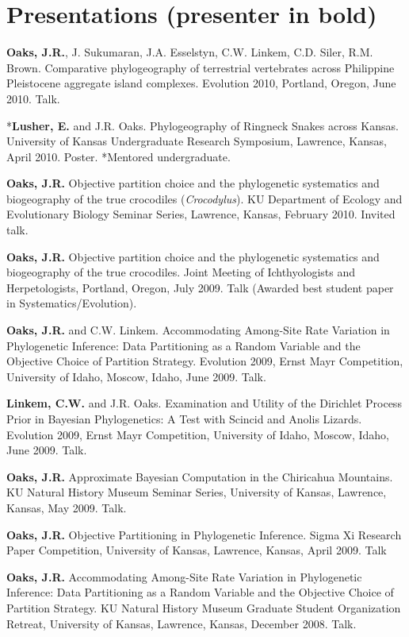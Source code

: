 \documentclass[10pt]{article}
\newcommand{\myHangIndent}{\hangindent=5mm}
\begin{document}
\section*{Presentations (presenter in bold)}
\myHangIndent
{\bf Oaks, J.R.}, J. Sukumaran, J.A. Esselstyn, C.W. Linkem, C.D. Siler, R.M.
Brown.
Comparative phylogeography of terrestrial vertebrates across Philippine
Pleistocene aggregate island complexes.
Evolution 2010, Portland, Oregon, June 2010.
Talk.

\myHangIndent
*{\bf Lusher, E.} and J.R. Oaks.
Phylogeography of Ringneck Snakes across Kansas.
University of Kansas Undergraduate Research Symposium, Lawrence, Kansas, April
2010.
Poster.
*Mentored undergraduate.

\myHangIndent
{\bf Oaks, J.R.}
Objective partition choice and the phylogenetic systematics and biogeography of
the true crocodiles (\emph{Crocodylus}).
KU Department of Ecology and Evolutionary Biology Seminar Series, Lawrence,
Kansas, February 2010.
Invited talk.

\myHangIndent
{\bf Oaks, J.R.}
Objective partition choice and the phylogenetic systematics and biogeography of
the true crocodiles.
Joint Meeting of Ichthyologists and Herpetologists, Portland, Oregon, July
2009.
Talk (Awarded best student paper in Systematics/Evolution).

\myHangIndent
{\bf Oaks, J.R.} and C.W. Linkem.
Accommodating Among-Site Rate Variation in Phylogenetic Inference: Data
Partitioning as a Random Variable and the Objective Choice of Partition
Strategy.
Evolution 2009, Ernst Mayr Competition, University of Idaho, Moscow, Idaho,
June 2009.
Talk.

\myHangIndent
{\bf Linkem, C.W.} and J.R. Oaks.
Examination and Utility of the Dirichlet Process Prior in Bayesian
Phylogenetics: A Test with Scincid and Anolis Lizards.
Evolution 2009, Ernst Mayr Competition, University of Idaho, Moscow, Idaho,
June 2009.
Talk.

\myHangIndent
{\bf Oaks, J.R.}
Approximate Bayesian Computation in the Chiricahua Mountains.
KU Natural History Museum Seminar Series, University of Kansas, Lawrence,
Kansas, May 2009.
Talk.

\myHangIndent
{\bf Oaks, J.R.}
Objective Partitioning in Phylogenetic Inference.
Sigma Xi Research Paper Competition, University of Kansas, Lawrence, Kansas,
April 2009.
Talk

\myHangIndent
{\bf Oaks, J.R.}
Accommodating Among-Site Rate Variation in Phylogenetic Inference: Data
Partitioning as a Random Variable and the Objective Choice of Partition
Strategy.
KU Natural History Museum Graduate Student Organization Retreat, University of
Kansas, Lawrence, Kansas, December 2008.
Talk.
\end{document}
